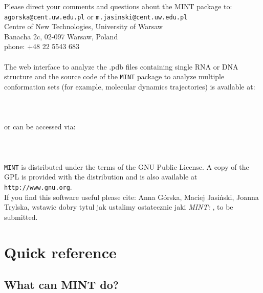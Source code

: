 \documentclass[12pt]{article}
\begin{document}
\noindent
Please direct your comments and questions about the MINT package to:\\
{\tt{agorska@cent.uw.edu.pl}} or {\tt{m.jasinski@cent.uw.edu.pl}}\\
Centre of New Technologies,
University of Warsaw\\
Banacha 2c, 02-097 Warsaw, Poland\\
phone:  $+$48 22 5543 683 \\ 
\\
The web interface to analyze the .pdb files containing single RNA or DNA structure and the source code of the {\tt MINT} package to analyze multiple conformation sets (for example, molecular dynamics trajectories) is available at:\\
\\
{}\\
\\
\noindent
or can be accessed via:\\
\\ 
{}\\
\\
{\tt MINT} is distributed under the terms of the GNU Public License. 
A copy of the GPL is provided with the distribution and is also available at {\color{Blue}\tt{http://www.gnu.org}}. \\

\noindent
If you find this software useful please cite: Anna G\'{o}rska, Maciej Jasi\'{n}ski, Joanna Trylska, {\color{red} wstawic dobry tytul jak ustalimy ostatecznie jaki {\it MINT: }}, to be submitted. 

\section{Quick reference}
\subsection{What can MINT do?}
\end{document}
